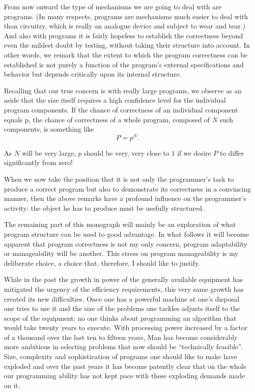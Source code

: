 \documentclass[twoside,11pt]{book}
\begin{document}
From now onward the type of mechanisms we are going to deal with are programs. (In many respects, programs are mechanisms much easier to deal with than circuitry, which is really an analogue device and subject to wear and tear.) And also with programs it is fairly hopeless to establish the correctness beyond even the mildest doubt by testing, without taking their structure into account. In other words, we remark that the extent to which the program correctness can be established is not purely a function of the program's external specifications and behavior but depends critically upon its internal structure.

Recalling that our true concern is with really large programs, we observe as an aside that the size itself requires a high confidence level for the individual program components. If the chance of correctness of an individual component equals p, the chance of correctness of a whole program, composed of $N$ such components, is something like
$$
P=p^N.
$$

As $N$ will be very large, $p$ should be very, very close to $1$ if we desire $P$ to differ significantly from zero!

When we now take the position that it is not only the programmer's task to produce a correct program but also to demonstrate its correctness in a convincing manner, then the above remarks have a profound influence on the programmer's activity: the object he has to produce must be usefully
structured.

The remaining part of this monograph will mainly be an exploration of what program structure can be used to good advantage. In what follows it will become apparent that program correctness is not my only concern, program adaptability or manageability will be another. This stress on program manageability is my deliberate choice, a choice that, therefore, I should like to justify.

While in the past the growth in power of the generally available equipment has mitigated the urgency of the efficiency requirements, this very same growth has created its new difficulties. Once one has a powerful machine at one's disposal one tries to use it and the size of the problems one tackles adjusts itself to the scope of the equipment: no one thinks about programming an algorithm that would take twenty years to execute. With processing power increased by a factor of a thousand over the last ten to fifteen years, Man has become considerably more ambitious in selecting problems that now should be ``technically feasible''. Size, complexity and sophistication of programs one should like to make have exploded and over the past years it has become patently clear that on the whole our programming ability has not kept pace with these exploding demands made on it.
\end{document}
